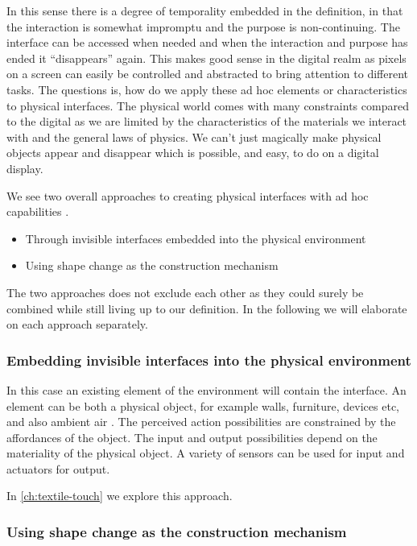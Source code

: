In this sense there is a degree of temporality embedded in the definition, in that the interaction is somewhat impromptu and the purpose is non-continuing.
The interface can be accessed when needed and when the interaction and purpose has ended it ``disappears'' again.
This makes good sense in the digital realm as pixels on a screen can easily be controlled and abstracted to bring attention to different tasks.
The questions is, how do we apply these ad hoc elements or characteristics to physical interfaces.
The physical world comes with many constraints compared to the digital as we are limited by the characteristics of the materials we interact with and the general laws of physics.
We can't just magically make physical objects appear and disappear which is possible, and easy, to do on a digital display.

We see two overall approaches to creating physical interfaces with ad hoc capabilities .
\begin{itemize}
	\item{Through invisible interfaces embedded into the physical environment}
	\item{Using shape change as the construction mechanism}
\end{itemize}

The two approaches does not exclude each other as they could surely be combined while still living up to our definition.
In the following we will elaborate on each approach separately.

\subsubsection{Embedding invisible interfaces into the physical environment}

In this case an existing element of the environment will contain the interface.
An element can be both a physical object, for example walls, furniture, devices etc, and also ambient air .
The perceived action possibilities are constrained by the affordances of the object. 
The input and output possibilities depend on the materiality of the physical object.
A variety of sensors can be used for input and actuators for output.

In \autoref{ch:textile-touch} we explore this approach.

\subsubsection{Using shape change as the construction mechanism}

